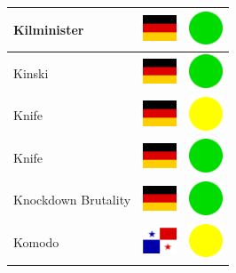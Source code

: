 \documentclass[12pt, a4paper, twoside]{report}
\begin{document}
\begin{center}
\begin{longtable}{|p{5cm}|p{2cm}|p{2cm}|}
 Kilminister                                                & \includegraphics[width=1cm]{../img/flags/de} &   \includegraphics[width=1cm]{../likes/y} \\ \hline
 Kinski                                                     & \includegraphics[width=1cm]{../img/flags/de} &   \includegraphics[width=1cm]{../likes/y} \\ \hline
 Knife                                                      & \includegraphics[width=1cm]{../img/flags/de} &   \includegraphics[width=1cm]{../likes/m} \\ \hline
 Knife                                                      & \includegraphics[width=1cm]{../img/flags/de} &   \includegraphics[width=1cm]{../likes/y} \\ \hline
 Knockdown Brutality                                        & \includegraphics[width=1cm]{../img/flags/de} &   \includegraphics[width=1cm]{../likes/y} \\ \hline
 Komodo                                                     & \includegraphics[width=1cm]{../img/flags/pa} &   \includegraphics[width=1cm]{../likes/m} \\ \hline

\end{longtable}
\end{center}
\end{document}
